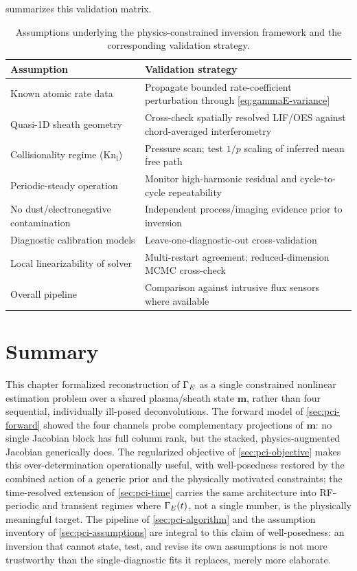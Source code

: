  summarizes this validation matrix.

\begin{table}[htbp]
\centering
\caption{Assumptions underlying the physics-constrained inversion framework and the corresponding validation strategy.}
\label{tab:assumptions}
\begin{tabularx}{\textwidth}{@{}p{4.6cm} X@{}}
\toprule
Assumption & Validation strategy \\
\midrule
Known atomic rate data & Propagate bounded rate-coefficient perturbation through \cref{eq:gammaE-variance} \\
Quasi-1D sheath geometry & Cross-check spatially resolved LIF/OES against chord-averaged interferometry \\
Collisionality regime ($\mathrm{Kn}_{\mathrm i}$) & Pressure scan; test $1/p$ scaling of inferred mean free path \\
Periodic-steady operation & Monitor high-harmonic residual and cycle-to-cycle repeatability \\
No dust/electronegative contamination & Independent process/imaging evidence prior to inversion \\
Diagnostic calibration models & Leave-one-diagnostic-out cross-validation \\
Local linearizability of solver & Multi-restart agreement; reduced-dimension MCMC cross-check \\
Overall pipeline & Comparison against intrusive flux sensors where available \\
\bottomrule
\end{tabularx}
\end{table}

\section{Summary}
\label{sec:pci-summary}

This chapter formalized reconstruction of $\Gamma_{E}$ as a single constrained nonlinear estimation problem over a shared plasma/sheath state $\mathbf m$, rather than four sequential, individually ill-posed deconvolutions. The forward model of \cref{sec:pci-forward} showed the four channels probe complementary projections of $\mathbf m$: no single Jacobian block has full column rank, but the stacked, physics-augmented Jacobian generically does. The regularized objective of \cref{sec:pci-objective} makes this over-determination operationally useful, with well-posedness restored by the combined action of a generic prior and the physically motivated constraints; the time-resolved extension of \cref{sec:pci-time} carries the same architecture into RF-periodic and transient regimes where $\Gamma_{E}(t)$, not a single number, is the physically meaningful target. The pipeline of \cref{sec:pci-algorithm} and the assumption inventory of \cref{sec:pci-assumptions} are integral to this claim of well-posedness: an inversion that cannot state, test, and revise its own assumptions is not more trustworthy than the single-diagnostic fits it replaces, merely more elaborate.

